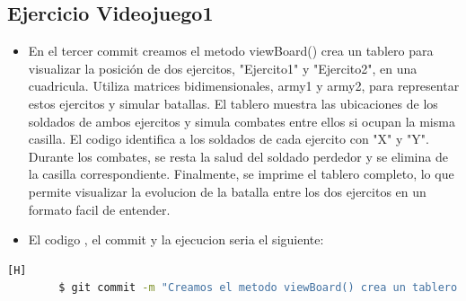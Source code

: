 \documentclass{article}
\begin{document}
	\subsection{Ejercicio Videojuego1}
	\begin{itemize}	
		\item En el tercer commit creamos el metodo viewBoard() crea un tablero para visualizar la posición de dos ejercitos, "Ejercito1" y "Ejercito2", en una cuadricula. Utiliza matrices bidimensionales, army1 y army2, para representar estos ejercitos y simular batallas. El tablero muestra las ubicaciones de los soldados de ambos ejercitos y simula combates entre ellos si ocupan la misma casilla. El codigo identifica a los soldados de cada ejercito con "X" y "Y". Durante los combates, se resta la salud del soldado perdedor y se elimina de la casilla correspondiente. Finalmente, se imprime el tablero completo, lo que permite visualizar la evolucion de la batalla entre los dos ejercitos en un formato facil de entender.
		\item El codigo , el commit y la ejecucion seria el siguiente:
	\end{itemize}	
	\begin{lstlisting}[language=bash,caption={Commit}][H]
		$ git commit -m "Creamos el metodo viewBoard() crea un tablero para visualizar la posicion de dos ejercitos, Ejercito1 y Ejercito2, en una cuadricula. Utiliza matrices bidimensionales, army1 y army2, para representar estos ejercitos y simular batallas. El tablero muestra las ubicaciones de los soldados de ambos ejercitos y simula combates entre ellos si ocupan la misma casilla. El codigo identifica a los soldados de cada ejercito con X y Y. Durante los combates, se resta la salud del soldado perdedor y se elimina de la casilla correspondiente. Finalmente, se imprime el tablero completo, lo que permite visualizar la evolucion de la batalla entre los dos ejercitos en un formato facil de entender."
	\end{lstlisting}	
\end{document}
